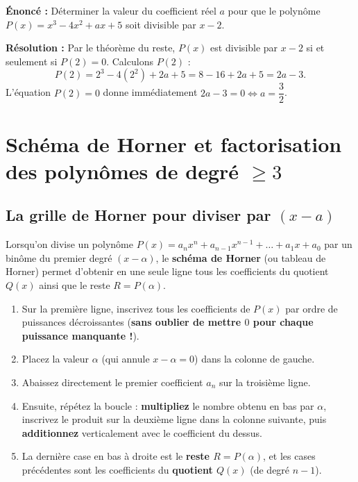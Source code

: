 \begin{exemple}
\textbf{Énoncé :} Déterminer la valeur du coefficient réel $a$ pour que le polynôme $P(x) = x^3 - 4x^2 + ax + 5$ soit divisible par $x - 2$.

\textbf{Résolution :} Par le théorème du reste, $P(x)$ est divisible par $x - 2$ si et seulement si $P(2) = 0$. Calculons $P(2)$ :
\[
    P(2) = 2^3 - 4(2^2) + 2a + 5 = 8 - 16 + 2a + 5 = 2a - 3.
\]
L'équation $P(2) = 0$ donne immédiatement $2a - 3 = 0 \iff \boxed{a = \dfrac{3}{2}}$.
\end{exemple}

\section{Schéma de Horner et factorisation des polynômes de degré $\ge 3$}

\subsection{La grille de Horner pour diviser par $(x - a)$}

Lorsqu'on divise un polynôme $P(x) = a_n x^n + a_{n-1} x^{n-1} + \dots + a_1 x + a_0$ par un binôme du premier degré $(x - \alpha)$, le \textbf{schéma de Horner} (ou tableau de Horner) permet d'obtenir en une seule ligne tous les coefficients du quotient $Q(x)$ ainsi que le reste $R = P(\alpha)$.

\begin{astuce}
\begin{enumerate}
    \item Sur la première ligne, inscrivez tous les coefficients de $P(x)$ par ordre de puissances décroissantes (\textbf{sans oublier de mettre $0$ pour chaque puissance manquante !}).
    \item Placez la valeur $\alpha$ (qui annule $x - \alpha = 0$) dans la colonne de gauche.
    \item Abaissez directement le premier coefficient $a_n$ sur la troisième ligne.
    \item Ensuite, répétez la boucle : \textbf{multipliez} le nombre obtenu en bas par $\alpha$, inscrivez le produit sur la deuxième ligne dans la colonne suivante, puis \textbf{additionnez} verticalement avec le coefficient du dessus.
    \item La dernière case en bas à droite est le \textbf{reste $R = P(\alpha)$}, et les cases précédentes sont les coefficients du \textbf{quotient $Q(x)$} (de degré $n - 1$).
\end{enumerate}
\end{astuce}

